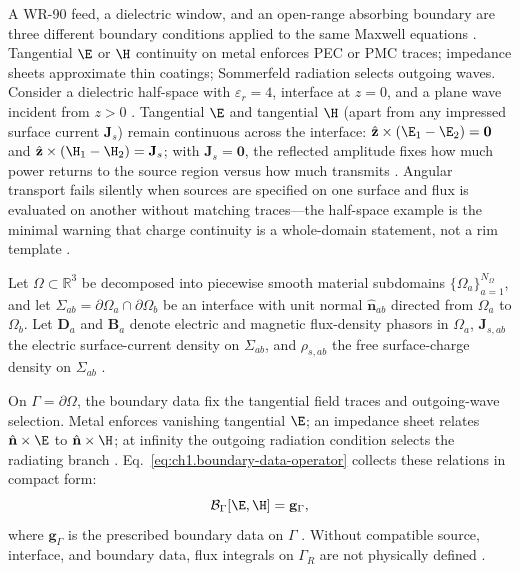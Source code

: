 A WR-90 feed, a dielectric window, and an open-range absorbing boundary are three different boundary conditions applied to the same Maxwell equations \cite{stratton1941}. Tangential $\E$ or $\H$ continuity on metal enforces PEC or PMC traces; impedance sheets approximate thin coatings; Sommerfeld radiation selects outgoing waves. Consider a dielectric half-space with $\varepsilon_r=4$, interface at $z=0$, and a plane wave incident from $z>0$ \cite{stratton1941}. Tangential $\E$ and tangential $\H$ (apart from any impressed surface current $\mathbf{J}_s$) remain continuous across the interface: $\hat{\mathbf{z}}\times(\E_1-\E_2)=\mathbf{0}$ and $\hat{\mathbf{z}}\times(\H_1-\H_2)=\mathbf{J}_s$; with $\mathbf{J}_s=\mathbf{0}$, the reflected amplitude fixes how much power returns to the source region versus how much transmits \cite{jackson1999}. Angular transport fails silently when sources are specified on one surface and flux is evaluated on another without matching traces---the half-space example is the minimal warning that charge continuity is a whole-domain statement, not a rim template \cite{harrington2001}.

Let \(\Omega\subset\mathbb{R}^3\) be decomposed into piecewise smooth material
subdomains \(\{\Omega_a\}_{a=1}^{N_\Omega}\), and let
\(\Sigma_{ab}=\partial\Omega_a\cap\partial\Omega_b\) be an interface with unit
normal \(\hat{\mathbf{n}}_{ab}\) directed from \(\Omega_a\) to \(\Omega_b\). Let
\(\mathbf{D}_a\) and \(\mathbf{B}_a\) denote electric and magnetic flux-density
phasors in \(\Omega_a\), \(\mathbf{J}_{s,ab}\) the electric surface-current
density on \(\Sigma_{ab}\), and \(\rho_{s,ab}\) the free surface-charge density
on \(\Sigma_{ab}\) \cite{stratton1941}.

On \(\Gamma=\partial\Omega\), the boundary data fix the tangential field traces and outgoing-wave selection. Metal enforces vanishing tangential \(\E\); an impedance sheet relates \(\hat{\mathbf{n}}\times\E\) to \(\hat{\mathbf{n}}\times\H\); at infinity the outgoing radiation condition selects the radiating branch \cite{stratton1941}. Eq.~\eqref{eq:ch1.boundary-data-operator} collects these relations in compact form:
\begin{equation}
\label{eq:ch1.boundary-data-operator}
\mathcal{B}_\Gamma[\E,\H]=\mathbf{g}_\Gamma,
\end{equation}
where \(\mathbf{g}_\Gamma\) is the prescribed boundary data on \(\Gamma\) \cite{stratton1941}. Without compatible source, interface, and boundary data, flux integrals on \(\Gamma_R\) are not physically defined \cite{hansen1988}.
\label{eq:ch1.data-specification-tuple}

